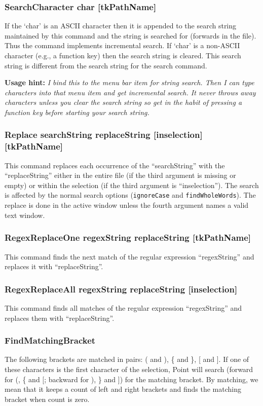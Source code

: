 \subsubsection{SearchCharacter char [tkPathName]}
If the `char' is an ASCII character then it is appended
to the search string maintained by this command and the
string is searched for (forwards in the file).
Thus the command implements incremental search.
If `char' is a non-ASCII character (e.g., a function key)
then the search string is cleared.
This search string is different from the search string for the
search command.

{\bf Usage hint:} {\it I bind this to the menu bar item
for string search.
Then I can type characters into that menu item and get incremental
search.
It never throws away characters unless you clear the search string
so get in the habit of pressing a function key before starting
your search string.}

\subsubsection{Replace searchString replaceString [inselection] [tkPathName]}
This command replaces each occurrence of the ``searchString'' with the
``replaceString'' either in the entire file (if the third argument is
missing or empty) or within the selection (if the third argument is
``inselection'').
The search is affected by the normal search options
({\tt ignoreCase} and {\tt findWholeWords}).
The replace is done in the active window unless the fourth
argument names a valid text window.

\subsubsection{RegexReplaceOne regexString replaceString [tkPathName]}
This command finds the next match of the regular expression
``regexString'' and replaces it with ``replaceString''.

\subsubsection{RegexReplaceAll regexString replaceString [inselection]}
This command finds all matches of the regular expression
``regexString'' and replaces them with ``replaceString''.

\subsubsection{FindMatchingBracket}
The following brackets are matched in pairs:
( and ), \{ and \}, [ and ].
If one of these characters is the first character of the selection,
Point will search (forward for (, \{ and [; backward for ), \} and ])
for the matching bracket.
By matching, we mean that it keeps a count of left and right brackets
and finds the matching bracket when count is zero.





